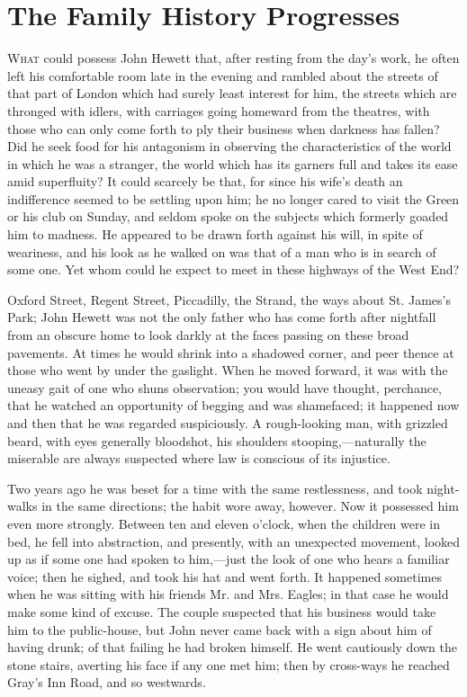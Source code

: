 \chapter{The Family History Progresses}

\textsc{What} could possess John Hewett that, after resting from the
day's work, he often left his comfortable room late in the evening and
rambled about the streets of that part of London which had surely least
interest for him, the streets which are thronged with idlers, with
carriages going homeward from the theatres, with those who can only come
forth to ply their business when darkness has fallen? Did he seek food
for his antagonism in observing the characteristics of the world in
which he was a stranger, the world which has its garners full and takes
its ease amid superfluity? It could scarcely be that, for since his
wife's death an indifference seemed to be settling upon him; he no
longer cared to visit the Green or his club on Sunday, and seldom spoke
on the subjects which formerly goaded {}him to madness. He appeared to
be drawn forth against his will, in spite of weariness, and his look as
he walked on was that of a man who is in search of some one. Yet whom
could he expect to meet in these highways of the West End?

Oxford Street, Regent Street, Piccadilly, the Strand, the ways about St.
James's Park; John Hewett was not the only father who has come forth
after nightfall from an obscure home to look darkly at the faces passing
on these broad pavements. At times he would shrink into a shadowed
corner, and peer thence at those who went by under the gaslight. When he
moved forward, it was with the uneasy gait of one who shuns observation;
you would have thought, perchance, that he watched an opportunity of
begging and was shamefaced; it happened now and then that he was
regarded suspiciously. A rough-looking man, with grizzled beard, with
eyes generally bloodshot, his shoulders stooping,---naturally the
miserable are always suspected where law is conscious of its injustice.

{}Two years ago he was beset for a time with the same restlessness, and
took night-walks in the same directions; the habit wore away, however.
Now it possessed him even more strongly. Between ten and eleven o'clock,
when the children were in bed, he fell into abstraction, and presently,
with an unexpected movement, looked up as if some one had spoken to
him,---just the look of one who hears a familiar voice; then he sighed,
and took his hat and went forth. It happened sometimes when he was
sitting with his friends Mr. and Mrs. Eagles; in that case he would make
some kind of excuse. The couple suspected that his business would take
him to the public-house, but John never came back with a sign about him
of having drunk; of that failing he had broken himself. He went
cautiously down the stone stairs, averting his face if any one met him;
then by cross-ways he reached Gray's Inn Road, and so westwards.


